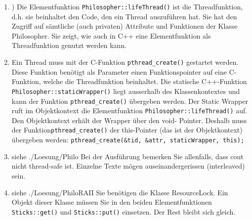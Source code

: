 \begin{enumerate}
  \item) Die Elementfunktion \texttt{Philosopher::lifeThread()} ist die Threadfunktion, d.h. sie beinhaltet den Code,
den ein Thread auszuführen hat. Sie hat den Zugriff auf sämtliche (auch privaten) Attribute und Funktionen
der Klasse Philosopher. Sie zeigt, wie auch in C++ eine Elementfunktion als Threadfunktion genutzt
werden kann.
\item Ein Thread muss mit der C-Funktion \texttt{pthread\_create()} gestartet werden. Diese Funktion benötigt als
Parameter einen Funktionspointer auf eine C-Funktion, welche die Threadfunktion beinhaltet. Die statische
C++-Funktion \texttt{Philosopher::staticWrapper()} liegt ausserhalb des Klassenkontextes und kann
der Funktion \texttt{pthread\_create()} übergeben werden. Der Static Wrapper ruft im Objektkontext die Elementfunktion
\texttt{Philosopher::lifeThread()} auf. Den Objektkontext erhält der Wrapper über den void-
Pointer. Deshalb muss der Funktion\texttt{pthread\_create()} der this-Pointer (das ist der Objektkontext)
übergeben werden:
\texttt{pthread\_create(\&tid, \&attr, staticWrapper, this);}
\item siehe ./Loesung/Philo
Bei der Ausführung bemerken Sie allenfalls, dass cout nicht thread-safe ist. Einzelne Texte mögen auseinandergerissen
(interleaved) sein.


\noindent\makebox[\linewidth]{\rule{\paperwidth}{0.4pt}}

\noindent\makebox[\linewidth]{\rule{\paperwidth}{0.4pt}}

\noindent\makebox[\linewidth]{\rule{\paperwidth}{0.4pt}}

\noindent\makebox[\linewidth]{\rule{\paperwidth}{0.4pt}}




\item siehe ./Loesung/PhiloRAII
Sie benötigen die Klasse ResourceLock. Ein Objekt dieser Klasse müssen Sie in den beiden Elementfunktionen
\texttt{Sticks::get()} und \texttt{Sticks::put()} einsetzen. Der Rest bleibt sich gleich.
\end{enumerate}

